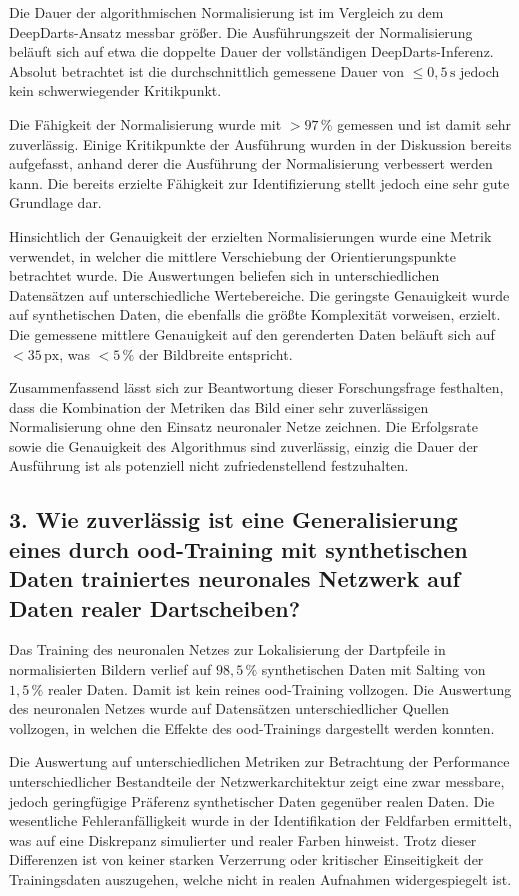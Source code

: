 Die Dauer der algorithmischen Normalisierung ist im Vergleich zu dem DeepDarts-Ansatz messbar größer. Die Ausführungszeit der Normalisierung beläuft sich auf etwa die doppelte Dauer der vollständigen DeepDarts-Inferenz. Absolut betrachtet ist die durchschnittlich gemessene Dauer von $\leq 0,5\,\text{s}$ jedoch kein schwerwiegender Kritikpunkt.

Die Fähigkeit der Normalisierung wurde mit $> 97\,\%$ gemessen und ist damit sehr zuverlässig. Einige Kritikpunkte der Ausführung wurden in der Diskussion bereits aufgefasst, anhand derer die Ausführung der Normalisierung verbessert werden kann. Die bereits erzielte Fähigkeit zur Identifizierung stellt jedoch eine sehr gute Grundlage dar.

Hinsichtlich der Genauigkeit der erzielten Normalisierungen wurde eine Metrik verwendet, in welcher die mittlere Verschiebung der Orientierungspunkte betrachtet wurde. Die Auswertungen beliefen sich in unterschiedlichen Datensätzen auf unterschiedliche Wertebereiche. Die geringste Genauigkeit wurde auf synthetischen Daten, die ebenfalls die größte Komplexität vorweisen, erzielt. Die gemessene mittlere Genauigkeit auf den gerenderten Daten beläuft sich auf $< 35\,\text{px}$, was $< 5\,\%$ der Bildbreite entspricht.

Zusammenfassend lässt sich zur Beantwortung dieser Forschungsfrage festhalten, dass die Kombination der Metriken das Bild einer sehr zuverlässigen Normalisierung ohne den Einsatz neuronaler Netze zeichnen. Die Erfolgsrate sowie die Genauigkeit des Algorithmus sind zuverlässig, einzig die Dauer der Ausführung ist als potenziell nicht zufriedenstellend festzuhalten.

\subsection*{3. Wie zuverlässig ist eine Generalisierung eines durch \ac{ood}-Training mit synthetischen Daten trainiertes neuronales Netzwerk auf Daten realer Dartscheiben?}

Das Training des neuronalen Netzes zur Lokalisierung der Dartpfeile in normalisierten Bildern verlief auf $98,5\,\%$ synthetischen Daten mit Salting von $1,5\,\%$ realer Daten. Damit ist kein reines \ac{ood}-Training vollzogen. Die Auswertung des neuronalen Netzes wurde auf Datensätzen unterschiedlicher Quellen vollzogen, in welchen die Effekte des \ac{ood}-Trainings dargestellt werden konnten.

Die Auswertung auf unterschiedlichen Metriken zur Betrachtung der Performance unterschiedlicher Bestandteile der Netzwerkarchitektur zeigt eine zwar messbare, jedoch geringfügige Präferenz synthetischer Daten gegenüber realen Daten. Die wesentliche Fehleranfälligkeit wurde in der Identifikation der Feldfarben ermittelt, was auf eine Diskrepanz simulierter und realer Farben hinweist. Trotz dieser Differenzen ist von keiner starken Verzerrung oder kritischer Einseitigkeit der Trainingsdaten auszugehen, welche nicht in realen Aufnahmen widergespiegelt ist.

